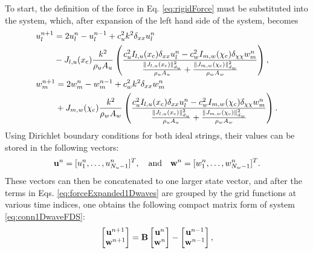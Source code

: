 To start, the definition of the force in Eq. \eqref{eq:rigidForce} must be substituted into the system, which, after expansion of the left hand side of the system, becomes
\begin{subequations}\label{eq:forceExpanded1Dwaves}
    \begin{align}
        &\begin{aligned}
            u_l^{n+1} &= 2u_l^n - u_l^{n-1} + c_u^2k^2\delta_{xx} u_l^n \\
            &- J_{l, u}(x_{\text{c}})\frac{k^2}{\rho_u A_u} \left(\frac{c_u^2 I_{l, u}(x_{\text{c}})\delta_{xx} u_l^n - c_w^2 I_{m, w}(\chi_{\text{c}})\delta_{\chi\chi} w_m^n}{\frac{\lVert J_{l, u}(x_{\text{c}})\rVert_{d_u}^2}{\rho_u A_u} + \frac{\lVert J_{m, w}(\chi_{\text{c}})\rVert_{d_w}^2}{\rho_w A_w}}\right), 
        \end{aligned}\\
        &\begin{aligned}
            w_m^{n+1} &= 2w_m^n - w_m^{n-1} + c_w^2k^2\delta_{xx} w_m^n \\
            &+ J_{m, w}(\chi_{\text{c}})\frac{k^2}{\rho_w A_w} \left(\frac{c_u^2 I_{l, u}(x_{\text{c}})\delta_{xx} u_l^n - c_w^2 I_{m, w}(\chi_{\text{c}})\delta_{\chi\chi} w_m^n}{\frac{\lVert J_{l, u}(x_{\text{c}})\rVert_{d_u}^2}{\rho_u A_u} + \frac{\lVert J_{m, w}(\chi_{\text{c}})\rVert_{d_w}^2}{\rho_w A_w}}\right).
        \end{aligned}
    \end{align}
\end{subequations}
Using Dirichlet boundary conditions for both ideal strings, their values can be stored in the following vectors:
\begin{equation*}
    \mathbf{u}^n =[u_1^n, \hdots, u_{N_u-1}^n]^T, \quad \text{and} \quad \mathbf{w}^n =[w_1^n, \hdots, w_{N_w-1}^n]^T.
\end{equation*}
These vectors can then be concatenated to one larger state vector, and after the terms in Eqs. \eqref{eq:forceExpanded1Dwaves} are grouped by the grid functions at various time indices, one obtains the following compact matrix form of system \eqref{eq:conn1DwaveFDS}:
\begin{equation}\label{eq:conn1DwaveMatrix} 
    \begin{bmatrix}
        \mathbf{u}^{n+1}\\
        \mathbf{w}^{n+1}
    \end{bmatrix} = \mathbf{B} \begin{bmatrix}
        \mathbf{u}^n\\
        \mathbf{w}^n
    \end{bmatrix} - \begin{bmatrix}
        \mathbf{u}^{n-1}\\
        \mathbf{w}^{n-1}
    \end{bmatrix},
\end{equation}
